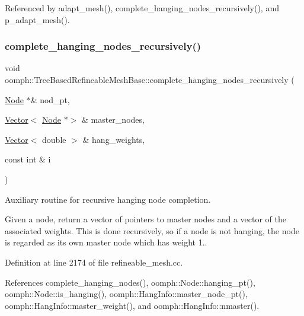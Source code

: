 Referenced by adapt\+\_\+mesh(), complete\+\_\+hanging\+\_\+nodes\+\_\+recursively(), and p\+\_\+adapt\+\_\+mesh().

\mbox{\label{classoomph_1_1TreeBasedRefineableMeshBase_a0fe9eaf7cd5b0a664e76643f8fea5504}} 
\subsubsection{\texorpdfstring{complete\+\_\+hanging\+\_\+nodes\+\_\+recursively()}{complete\_hanging\_nodes\_recursively()}}
{\footnotesize\ttfamily void oomph\+::\+Tree\+Based\+Refineable\+Mesh\+Base\+::complete\+\_\+hanging\+\_\+nodes\+\_\+recursively (\begin{DoxyParamCaption}\item[{\hyperlink{classoomph_1_1Node}{Node} $\ast$\&}]{nod\+\_\+pt,  }\item[{\hyperlink{classoomph_1_1Vector}{Vector}$<$ \hyperlink{classoomph_1_1Node}{Node} $\ast$$>$ \&}]{master\+\_\+nodes,  }\item[{\hyperlink{classoomph_1_1Vector}{Vector}$<$ double $>$ \&}]{hang\+\_\+weights,  }\item[{const int \&}]{i }\end{DoxyParamCaption})\hspace{0.3cm}{\ttfamily [protected]}}



Auxiliary routine for recursive hanging node completion. 

Given a node, return a vector of pointers to master nodes and a vector of the associated weights. This is done recursively, so if a node is not hanging, the node is regarded as its own master node which has weight 1.. 

Definition at line 2174 of file refineable\+\_\+mesh.\+cc.



References complete\+\_\+hanging\+\_\+nodes(), oomph\+::\+Node\+::hanging\+\_\+pt(), oomph\+::\+Node\+::is\+\_\+hanging(), oomph\+::\+Hang\+Info\+::master\+\_\+node\+\_\+pt(), oomph\+::\+Hang\+Info\+::master\+\_\+weight(), and oomph\+::\+Hang\+Info\+::nmaster().




